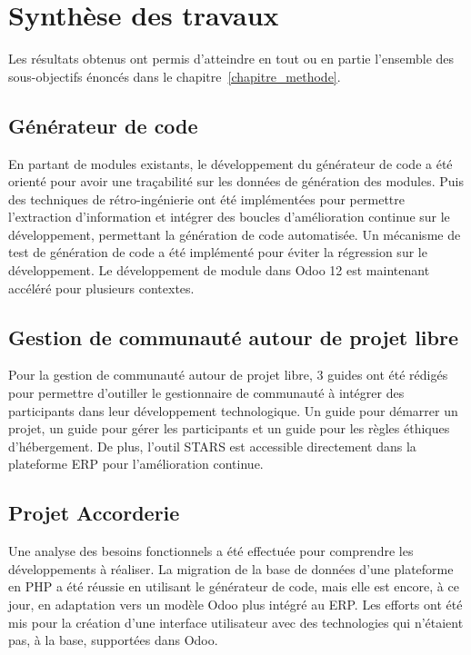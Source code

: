 \label{sec:Conclusion}

\section{Synthèse des travaux}
Les résultats obtenus ont permis d’atteindre en tout ou en partie l’ensemble des sous-objectifs énoncés dans le chapitre~\ref{chapitre_methode}.%


\subsection{Générateur de code}

En partant de modules existants, le développement du générateur de code a été orienté pour avoir une traçabilité sur les données de génération des modules. Puis des techniques de rétro-ingénierie ont été implémentées pour permettre l'extraction d'information et intégrer des boucles d'amélioration continue sur le développement, permettant la génération de code automatisée. Un mécanisme de test de génération de code a été implémenté pour éviter la régression sur le développement. Le développement de module dans Odoo 12 est maintenant accéléré pour plusieurs contextes.

\subsection{Gestion de communauté autour de projet libre}
Pour la gestion de communauté autour de projet libre, 3 guides ont été rédigés pour permettre d'outiller le gestionnaire de communauté à intégrer des participants dans leur développement technologique. Un guide pour démarrer un projet, un guide pour gérer les participants et un guide pour les règles éthiques d'hébergement. De plus, l'outil STARS est accessible directement dans la plateforme ERP pour l'amélioration continue.

\subsection{Projet Accorderie}

Une analyse des besoins fonctionnels a été effectuée pour comprendre les développements à réaliser. La migration de la base de données d'une plateforme en PHP a été réussie en utilisant le générateur de code, mais elle est encore, à ce jour, en adaptation vers un modèle Odoo plus intégré au ERP. Les efforts ont été mis pour la création d’une interface utilisateur avec des technologies qui n’étaient pas, à la base, supportées dans Odoo.

